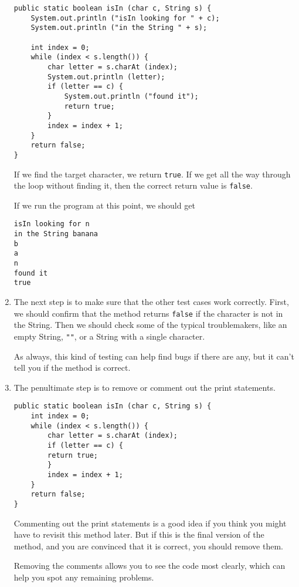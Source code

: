 \documentclass{book}
\begin{document}
\begin{enumerate}
\begin{verbatim}
public static boolean isIn (char c, String s) {
    System.out.println ("isIn looking for " + c);
    System.out.println ("in the String " + s);

    int index = 0;
    while (index < s.length()) {
        char letter = s.charAt (index);
        System.out.println (letter);
        if (letter == c) {
            System.out.println ("found it");
            return true;
        }
        index = index + 1;
    }
    return false;
}
\end{verbatim}

If we find the target character, we return {\tt true}.
If we get all the way through the loop without finding it, then
the correct return value is {\tt false}.

If we run the program at this point, we should get

\begin{verbatim}
isIn looking for n
in the String banana
b
a
n
found it
true
\end{verbatim}


\item The next step is to make sure that the other test cases
work correctly.  First, we should confirm that the method returns
{\tt false} if the character is not in the String.
Then we should check some of the typical troublemakers, like
an empty String, {\tt ""}, or a String with a single character.

As always, this kind of testing can help find bugs if there
are any, but it can't tell you if the method is correct.

\item The penultimate step is to remove or comment out the print
statements.

\begin{verbatim}
public static boolean isIn (char c, String s) {
    int index = 0;
    while (index < s.length()) {
        char letter = s.charAt (index);
        if (letter == c) {
	    return true;
        }
        index = index + 1;
    }
    return false;
}
\end{verbatim}

Commenting out the print statements is a good idea if you
think you might have to revisit this method later.  But if
this is the final version of the method, and you are convinced
that it is correct, you should remove them.

Removing the comments allows you to see the code most clearly,
which can help you spot any remaining problems.


\end{enumerate}
\end{document}
